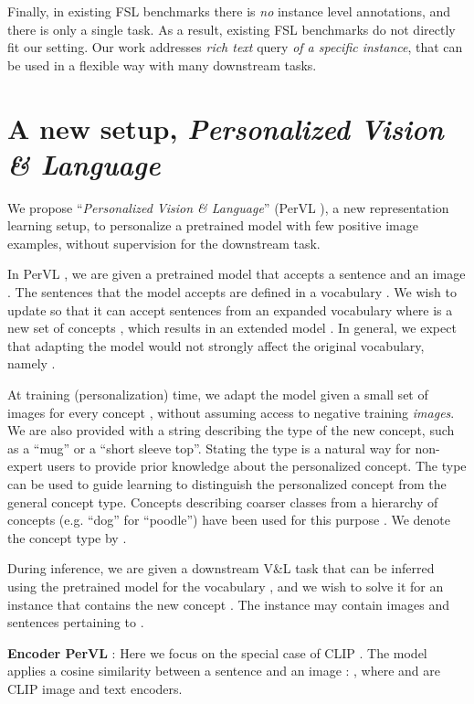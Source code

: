 \documentclass[runningheads]{llncs}
\newcommand\edit[1]{#1}
\newcommand{\VL}{V\&L {}}
\newcommand{\PerVL}{PerVL {}}
\begin{document}
\edit{Finally, in existing FSL benchmarks \cite{vinyals2016matching,ren2018metalearning,zhang2021personalized} there is \textit{no} instance level annotations, and there is only a single task. As a result, existing FSL benchmarks do not directly fit our setting. Our work addresses \textit{rich text} query \textit{of a specific instance}, that can be used in a flexible way with many downstream tasks. 
 }

\section{A new setup, \textit{Personalized Vision \& Language}}
We propose ``\textit{Personalized Vision \& Language}'' (\PerVL\!\!), a new representation learning setup, to personalize a pretrained model with few positive image examples, without supervision for the downstream task. 


In \PerVL, we are given a pretrained model  that accepts a sentence  and an image . The sentences that the model accepts are defined in a vocabulary . We wish to update  so that it can accept sentences from an expanded vocabulary  where  is a new set of concepts , which results in an extended model .
In general, we expect that adapting the model would not strongly affect the original vocabulary, namely . 


At training (personalization) time, we adapt the model given a small set of images  for every concept , without assuming access to negative training \textit{images}. We are also provided with a string describing the type of the new concept, such as a ``mug'' or a ``short sleeve top''.
Stating the type is a natural way for non-expert users to provide prior knowledge about the personalized concept. The type can be used to guide learning to distinguish the personalized concept from the general concept type.
Concepts describing coarser classes from a hierarchy of concepts (e.g. ``dog'' for ``poodle'') have been used for this purpose \cite{dekel2004large}.
We denote the concept type by .


During inference, we are given a downstream \VL task  that can be inferred using the pretrained model  for the vocabulary , and we wish to solve it for an instance  that contains the new concept . The instance may contain images and sentences pertaining to .

\textbf{Encoder \PerVL}:
Here we focus on the special case of CLIP \cite{radford2021learning}. The model  applies a cosine similarity between a sentence  and an image : , where  and  are CLIP image and text encoders.
\end{document}
